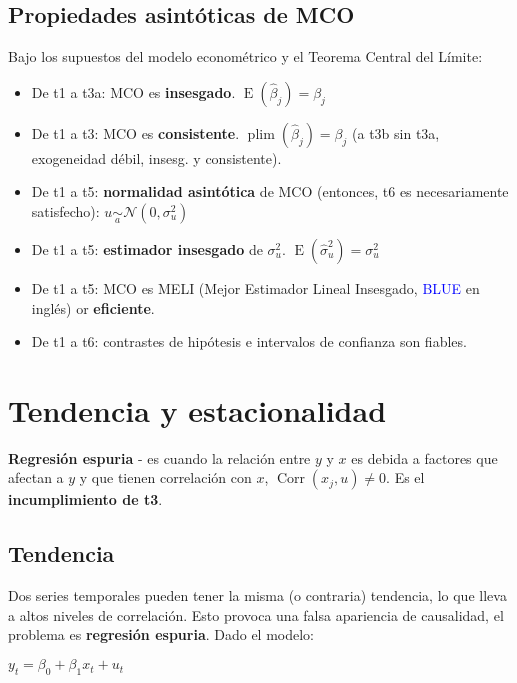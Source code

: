 \documentclass[10pt, a4paper, landscape]{article}
\DeclareMathOperator{\E}{E}
\DeclareMathOperator{\Corr}{Corr}
\begin{document}
\begin{multicols}{3}
\subsection*{Propiedades asintóticas de MCO}

Bajo los supuestos del modelo econométrico y el Teorema Central del Límite:

\begin{itemize}[leftmargin=*]
	\item De t1 a t3a: MCO es \textbf{insesgado}. \( \E(\hat{\beta}_{j}) = \beta_{j} \)
	\item De t1 a t3: MCO es \textbf{consistente}. \( \operatorname{plim}(\hat{\beta}_{j}) = \beta_{j} \) (a t3b sin t3a, exogeneidad débil, insesg. y consistente).
	\item De t1 a t5: \textbf{normalidad asintótica} de MCO (entonces, t6 es necesariamente satisfecho): \( u \underset{a}{\sim} \mathcal{N} (0, \sigma_{u}^{2}) \)
	\item De t1 a t5: \textbf{estimador insesgado} de \( \sigma_{u}^{2} \). \( \E(\hat{\sigma}_{u}^{2}) = \sigma^{2}_{u} \)
	\item De t1 a t5: MCO es MELI (Mejor Estimador Lineal Insesgado, \textcolor{blue}{BLUE} en inglés) or \textbf{eficiente}.
	\item De t1 a t6: contrastes de hipótesis e intervalos de confianza son fiables.
\end{itemize}

\columnbreak

\section*{Tendencia y estacionalidad}

\textbf{Regresión espuria} - es cuando la relación entre \( y \) y \( x \) es debida a factores que afectan a \( y \) y que tienen correlación con \( x \), \( \Corr(x_{j}, u) \neq 0 \). Es el \textbf{incumplimiento de t3}.

\subsection*{Tendencia}

Dos series temporales pueden tener la misma (o contraria) tendencia, lo que lleva a altos niveles de correlación. Esto provoca una falsa apariencia de causalidad, el problema es \textbf{regresión espuria}. Dado el modelo:

\begin{center}
	\( y_{t} = \beta_{0} + \beta_{1} x_{t} + u_{t} \)
\end{center}


\end{multicols}
\end{document}
